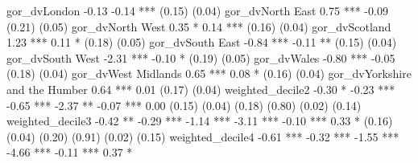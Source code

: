 gor_dvLondon                       -0.13         -0.14 ***                                                          
                                   (0.15)        (0.04)                                                             
gor_dvNorth East                    0.75 ***     -0.09                                                              
                                   (0.21)        (0.05)                                                             
gor_dvNorth West                    0.35 *        0.14 ***                                                          
                                   (0.16)        (0.04)                                                             
gor_dvScotland                      1.23 ***      0.11 *                                                            
                                   (0.18)        (0.05)                                                             
gor_dvSouth East                   -0.84 ***     -0.11 **                                                           
                                   (0.15)        (0.04)                                                             
gor_dvSouth West                   -2.31 ***     -0.10 *                                                            
                                   (0.19)        (0.05)                                                             
gor_dvWales                        -0.80 ***     -0.05                                                              
                                   (0.18)        (0.04)                                                             
gor_dvWest Midlands                 0.65 ***      0.08 *                                                            
                                   (0.16)        (0.04)                                                             
gor_dvYorkshire and the Humber      0.64 ***      0.01                                                              
                                   (0.17)        (0.04)                                                             
weighted_decile2                   -0.30 *       -0.23 ***     -0.65 ***     -2.37 **       -0.07 ***       0.00    
                                   (0.15)        (0.04)        (0.18)        (0.80)         (0.02)         (0.14)   
weighted_decile3                   -0.42 **      -0.29 ***     -1.14 ***     -3.11 ***      -0.10 ***       0.33 *  
                                   (0.16)        (0.04)        (0.20)        (0.91)         (0.02)         (0.15)   
weighted_decile4                   -0.61 ***     -0.32 ***     -1.55 ***     -4.66 ***      -0.11 ***       0.37 *  
